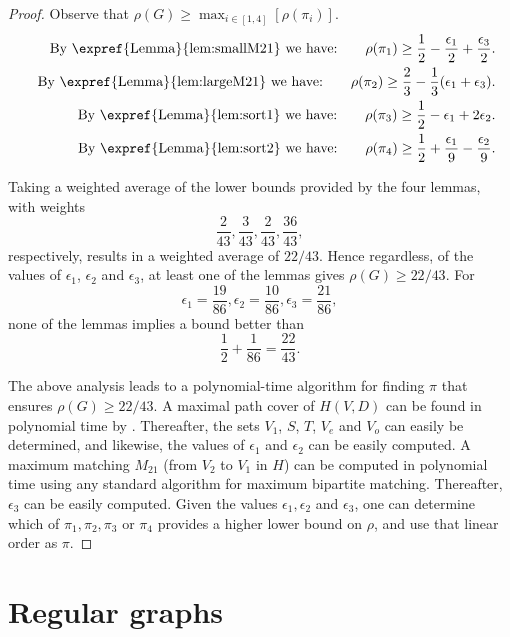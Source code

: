\documentclass{toc}
\theoremstyle{plain}
\begin{document}
\begin{proof}
	Observe that $\rho(G) \ge \max_{i \in [1,4]}[\rho(\pi_i)]$.
	\begin{eqnarray}
		& & \mbox{By \expref{Lemma}{lem:smallM21} we have:} \quad \quad
		\rho(\pi_1) \ge \frac{1}{2} - \frac{\epsilon_1}{2}  + \frac{\epsilon_3}{2}.\\
		& & \mbox{By \expref{Lemma}{lem:largeM21} we have:} \quad \quad
		\rho(\pi_2) \ge \frac{2}{3} - \frac{1}{3}(\epsilon_1 + \epsilon_3).\\
		& & \mbox{By \expref{Lemma}{lem:sort1} we have:} \quad \quad
		\rho(\pi_3) \ge \frac{1}{2} - \epsilon_1 + 2\epsilon_2.\\
		& & \mbox{By \expref{Lemma}{lem:sort2} we have:} \quad \quad
		\rho(\pi_4) \ge \frac{1}{2} + \frac{\epsilon_1}{9}  - \frac{\epsilon_2}{9}.
	\end{eqnarray}
	
	
	Taking a weighted average of the lower bounds provided by the four lemmas, with weights $$\frac{2}{43}, \frac{3}{43}, \frac{2}{43}, \frac{36}{43},$$ respectively, results in a weighted average of $22/43$. Hence regardless, of the values of $\epsilon_1$, $\epsilon_2$ and $\epsilon_3$, at least one of the lemmas gives $\rho(G) \ge 22/43$. For $$\epsilon_1 = \frac{19}{86}, \epsilon_2 = \frac{10}{86}, \epsilon_3 = \frac{21}{86},$$ none of the lemmas implies a bound better than $$\frac{1}{2} + \frac{1}{86} = \frac{22}{43}.$$
	
	The above analysis leads to a polynomial-time algorithm for finding $\pi$ that ensures $\rho(G) \ge 22/43.$ A maximal path cover of $H(V,D)$ can be found in polynomial time by . Thereafter, the sets $V_1$, $S$, $T$, $V_e$ and $V_o$ can easily be determined, and likewise, the values of $\epsilon_1$ and $\epsilon_2$ can be easily computed. A maximum matching $M_{21}$ (from $V_2$ to $V_1$ in $H$) can be computed in polynomial time using any standard algorithm for maximum bipartite matching. Thereafter, $\epsilon_3$ can be easily computed. Given the values $\epsilon_1, \epsilon_2$ and $\epsilon_3$, one can determine which of $\pi_1, \pi_2, \pi_3$ or $\pi_4$ provides a higher lower bound on $\rho$, and use that linear order as $\pi$.
\end{proof}




\section{Regular graphs}
\label{sec:regular}
\end{document}
